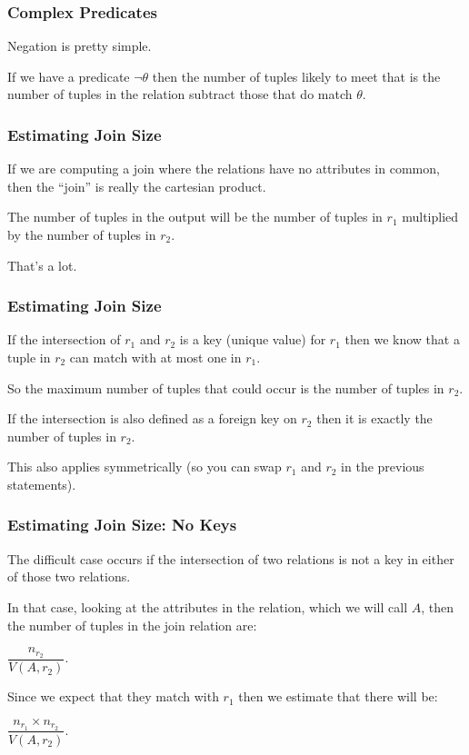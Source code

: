 \begin{frame}
\frametitle{Complex Predicates}

Negation is pretty simple.

If we have a predicate $\neg\theta$ then the number of tuples likely to meet that is the number of tuples in the relation subtract those that do match $\theta$.


\end{frame}

\begin{frame}
\frametitle{Estimating Join Size}

If we are computing a join where the relations have no attributes in common, then the ``join'' is really the cartesian product.

The number of tuples in the output will be the number of tuples in $r_{1}$ multiplied by the number of tuples in $r_{2}$. 

That's a lot.

\end{frame}

\begin{frame}
\frametitle{Estimating Join Size}

If the intersection of $r_{1}$ and $r_{2}$ is a key (unique value) for $r_{1}$ then we know that a tuple in $r_{2}$ can match with at most one in $r_{1}$.

So the maximum number of tuples that could occur is the number of tuples in $r_{2}$. 

If the intersection is also defined as a foreign key on $r_{2}$ then it is exactly the number of tuples in $r_{2}$. 

This also applies symmetrically (so you can swap $r_{1}$ and $r_{2}$ in the previous statements).


\end{frame}

\begin{frame}
\frametitle{Estimating Join Size: No Keys}

The difficult case occurs if the intersection of two relations is not a key in either of those two relations. 

In that case, looking at the attributes in the relation, which we will call $A$, then the number of tuples in the join relation are:

$\dfrac{n_{r_{2}}}{ V(A, r_{2})} $. 

Since we expect that they match with $r_{1}$ then we estimate that there will be:

$\dfrac{n_{r_{1}} \times n_{r_{2}}}{ V(A, r_{2})} $. 

\end{frame}

